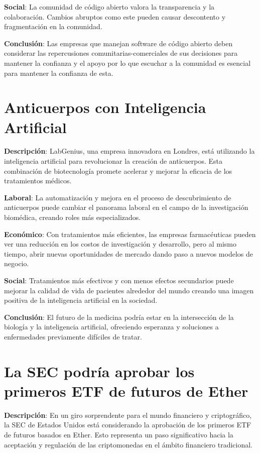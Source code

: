 \documentclass{article}
\begin{document}
\textbf{Social}: La comunidad de código abierto valora la transparencia y la colaboración. Cambios abruptos como este pueden causar descontento y fragmentación en la comunidad.

\textbf{Conclusión}: Las empresas que manejan software de código abierto deben considerar las repercusiones comunitarias-comerciales de sus decisiones para mantener la confianza y el apoyo por lo que escuchar a la comunidad es esencial para mantener la confianza de esta.

\section*{Anticuerpos con Inteligencia Artificial}

\textbf{Descripción}: LabGenius, una empresa innovadora en Londres, está utilizando la inteligencia artificial para revolucionar la creación de anticuerpos. Esta combinación de biotecnología promete acelerar y mejorar la eficacia de los tratamientos médicos.

\textbf{Laboral}: La automatización y mejora en el proceso de descubrimiento de anticuerpos puede cambiar el panorama laboral en el campo de la investigación biomédica, creando roles más especializados.

\textbf{Económico}: Con tratamientos más eficientes, las empresas farmacéuticas pueden ver una reducción en los costos de investigación y desarrollo, pero al mismo tiempo, abrir nuevas oportunidades de mercado dando paso a nuevos modelos de negocio.

\textbf{Social}: Tratamientos más efectivos y con menos efectos secundarios puede mejorar la calidad de vida de pacientes alrededor del mundo creando una imagen positiva de la inteligencia artificial en la sociedad.

\textbf{Conclusión}: El futuro de la medicina podría estar en la intersección de la biología y la inteligencia artificial, ofreciendo esperanza y soluciones a enfermedades previamente difíciles de tratar.

\section*{La SEC podría aprobar los primeros ETF de futuros de Ether}

\textbf{Descripción}: En un giro sorprendente para el mundo financiero y criptográfico, la SEC de Estados Unidos está considerando la aprobación de los primeros ETF de futuros basados en Ether. Esto representa un paso significativo hacia la aceptación y regulación de las criptomonedas en el ámbito financiero tradicional.
\end{document}
